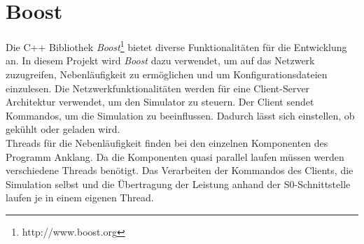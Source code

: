 \section{Boost}
Die C++ Bibliothek \textit{Boost}\footnote{http://www.boost.org} bietet diverse Funktionalitäten für die Entwicklung an. In diesem Projekt wird \textit{Boost} dazu verwendet, um auf das Netzwerk zuzugreifen, Nebenläufigkeit zu ermöglichen und um Konfigurationsdateien einzulesen. Die Netzwerkfunktionalitäten werden für eine Client-Server Architektur verwendet, um den Simulator zu steuern. Der Client sendet Kommandos, um die Simulation zu beeinflussen. Dadurch lässt sich einstellen, ob gekühlt oder geladen wird.\\
Threads für die Nebenläufigkeit finden bei den einzelnen Komponenten des Programm Anklang. Da die Komponenten quasi parallel laufen müssen werden verschiedene Threads benötigt. Das Verarbeiten der Kommandos des Clients, die Simulation selbst und die Übertragung der Leistung anhand der S0-Schnittstelle laufen je in einem eigenen Thread.
